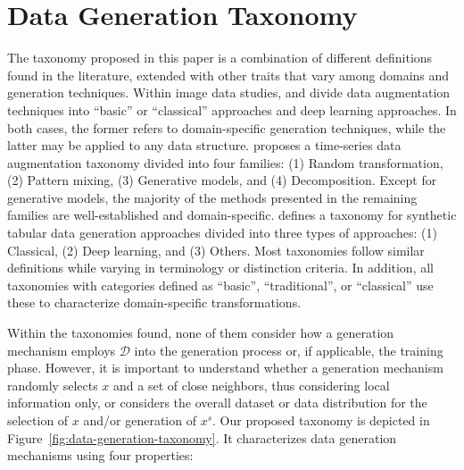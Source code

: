 \section{Data Generation Taxonomy}\label{sec:taxonomy}

The taxonomy proposed in this paper is a combination of
different definitions found in the literature, extended with other traits that
vary among domains and generation techniques. Within image data studies,
\cite{Shorten2019} and \cite{khalifa2021comprehensive} divide data
augmentation techniques into ``basic'' or ``classical'' approaches and deep
learning approaches. In both cases, the former refers to domain-specific
generation techniques, while the latter may be applied to any data structure.
\cite{Iwana2021} proposes a time-series data augmentation taxonomy
divided into four families: (1) Random transformation, (2) Pattern mixing, (3)
Generative models, and (4) Decomposition. Except for generative models,
the majority of the methods presented in the remaining families are
well-established and domain-specific. \cite{hernandez2022synthetic}
defines a taxonomy for synthetic tabular data generation approaches divided
into three types of approaches: (1) Classical, (2) Deep learning, and (3)
Others. Most taxonomies follow similar definitions while varying in
terminology or distinction criteria. In addition, all taxonomies with
categories defined as ``basic'', ``traditional'', or ``classical'' use these to
characterize domain-specific transformations.

Within the taxonomies found, none of them consider how a generation
mechanism employs $\mathcal{D}$ into the generation process or, if
applicable, the training phase. However, it is important to understand whether
a generation mechanism randomly selects $x$ and a set of close neighbors, thus
considering local information only, or considers the overall dataset or data
distribution for the selection of $x$ and/or generation of $x^s$. Our
proposed taxonomy is depicted in Figure~\ref{fig:data-generation-taxonomy}. It
characterizes data generation mechanisms using four properties:

